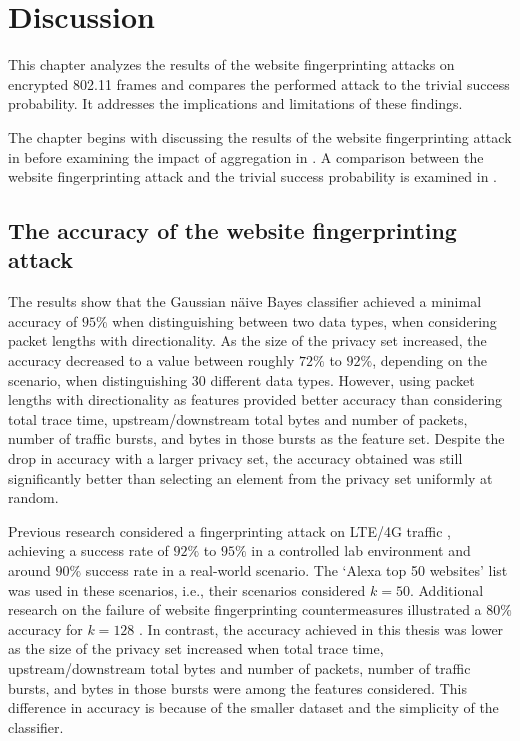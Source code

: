 \chapter{Discussion\label{ch:discussion}}

This chapter analyzes the results of the website fingerprinting attacks on encrypted 802.11 frames and compares the performed attack to the trivial success probability. It addresses the implications and limitations of these findings.

The chapter begins with discussing the results of the website fingerprinting attack in  before examining the impact of aggregation in . A comparison between the website fingerprinting attack and the trivial success probability is examined in .

\clearpage 

\section{The accuracy of the website fingerprinting attack\label{sec:accuracy-discussion}}

The results show that the Gaussian näive Bayes classifier achieved a minimal accuracy of $95\%$ when distinguishing between two data types, when considering packet lengths with directionality. As the size of the privacy set increased, the accuracy decreased to a value between roughly $72\%$ to $92\%$, depending on the scenario, when distinguishing $30$ different data types. However, using packet lengths with directionality as features provided better accuracy than considering total trace time, upstream/downstream total bytes and number of packets, number of traffic bursts, and bytes in those bursts as the feature set. Despite the drop in accuracy with a larger privacy set, the accuracy obtained was still significantly better than selecting an element from the privacy set uniformly at random.

Previous research considered a fingerprinting attack on LTE/4G traffic \cite{kohls2019lost}, achieving a success rate of $92\%$ to $95\%$ in a controlled lab environment and around $90\%$ success rate in a real-world scenario. The `Alexa top 50 websites' list was used in these scenarios, i.e., their scenarios considered $k=50$. Additional research on the failure of website fingerprinting countermeasures illustrated a $80\%$ accuracy for $k=128$ \cite{DBLP:conf/sp/DyerCRS12}. In contrast, the accuracy achieved in this thesis was lower as the size of the privacy set increased when total trace time, upstream/downstream total bytes and number of packets, number of traffic bursts, and bytes in those bursts were among the features considered. This difference in accuracy is because of the smaller dataset and the simplicity of the classifier.

